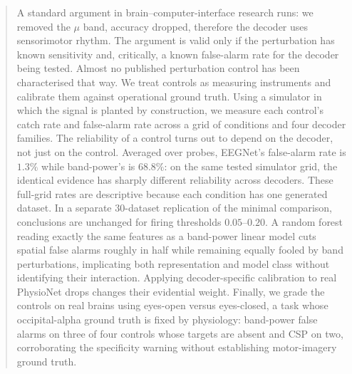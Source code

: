 \documentclass[manuscript,nonacm]{acmart}
\begin{document}
\begin{abstract}
A standard argument in brain--computer-interface research runs: we removed the $\mu$
band, accuracy dropped, therefore the decoder uses sensorimotor rhythm. The argument is
valid only if the perturbation has known sensitivity and, critically, a known
false-alarm rate for the decoder being tested. Almost no published perturbation control
has been characterised that way. We treat controls as measuring instruments and
calibrate them against operational ground truth. Using a simulator in which the signal
is planted by construction, we measure each control's catch rate and false-alarm rate
across a grid of conditions and four decoder families. The reliability of a control
turns out to depend on the decoder, not just on the control. Averaged over probes,
EEGNet's false-alarm rate is $1.3\%$ while band-power's is $68.8\%$: on the same
tested simulator grid, the identical evidence has sharply different reliability across
decoders. These full-grid rates are descriptive because each condition has one generated
dataset. In a separate $30$-dataset replication of the minimal comparison, conclusions
are unchanged for firing thresholds $0.05$--$0.20$. A random forest reading exactly the same
features as a band-power linear model cuts spatial false alarms roughly in half while
remaining equally fooled by band perturbations, implicating both representation and
model class without identifying their interaction. Applying decoder-specific calibration
to real PhysioNet drops changes their evidential weight. Finally, we grade the controls
on real brains using eyes-open versus
eyes-closed, a task whose occipital-alpha ground truth is fixed by physiology: band-power
false alarms on three of four controls whose targets are absent and CSP on two,
corroborating the specificity warning without establishing motor-imagery ground truth.
\end{abstract}



\maketitle

\end{document}
